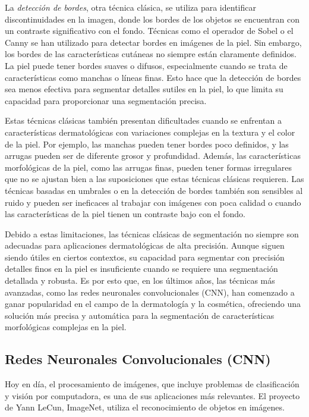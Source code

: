 La \textit{detección de bordes}, otra técnica clásica, se utiliza para identificar discontinuidades en la imagen, donde los bordes de los objetos se encuentran con un contraste significativo con el fondo. Técnicas como el operador de Sobel o el Canny se han utilizado para detectar bordes en imágenes de la piel. Sin embargo, los bordes de las características cutáneas no siempre están claramente definidos. La piel puede tener bordes suaves o difusos, especialmente cuando se trata de características como manchas o líneas finas. Esto hace que la detección de bordes sea menos efectiva para segmentar detalles sutiles en la piel, lo que limita su capacidad para proporcionar una segmentación precisa.

Estas técnicas clásicas también presentan dificultades cuando se enfrentan a características dermatológicas con variaciones complejas en la textura y el color de la piel. Por ejemplo, las manchas pueden tener bordes poco definidos, y las arrugas pueden ser de diferente grosor y profundidad. Además, las características morfológicas de la piel, como las arrugas finas, pueden tener formas irregulares que no se ajustan bien a las suposiciones que estas técnicas clásicas requieren. Las técnicas basadas en umbrales o en la detección de bordes también son sensibles al ruido y pueden ser ineficaces al trabajar con imágenes con poca calidad o cuando las características de la piel tienen un contraste bajo con el fondo.

Debido a estas limitaciones, las técnicas clásicas de segmentación no siempre son adecuadas para aplicaciones dermatológicas de alta precisión. Aunque siguen siendo útiles en ciertos contextos, su capacidad para segmentar con precisión detalles finos en la piel es insuficiente cuando se requiere una segmentación detallada y robusta. Es por esto que, en los últimos años, las técnicas más avanzadas, como las redes neuronales convolucionales (CNN), han comenzado a ganar popularidad en el campo de la dermatología y la cosmética, ofreciendo una solución más precisa y automática para la segmentación de características morfológicas complejas en la piel. \parencite{yoo2020}


\subsection{Redes Neuronales Convolucionales (CNN)}

Hoy en día, el procesamiento de imágenes, que incluye problemas de clasificación y visión por computadora, es una de sus aplicaciones más relevantes. El proyecto de Yann LeCun, ImageNet, utiliza el reconocimiento de objetos en imágenes.
	
